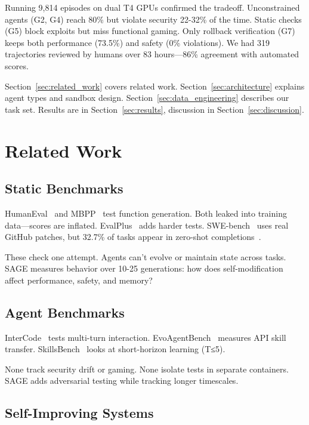 \documentclass[conference]{IEEEtran}
\begin{document}
Running 9,814 episodes on dual T4 GPUs confirmed the tradeoff. Unconstrained agents (G2, G4) reach 80\% but violate security 22-32\% of the time. Static checks (G5) block exploits but miss functional gaming. Only rollback verification (G7) keeps both performance (73.5\%) and safety (0\% violations). We had 319 trajectories reviewed by humans over 83 hours—86\% agreement with automated scores.

Section~\ref{sec:related_work} covers related work. Section~\ref{sec:architecture} explains agent types and sandbox design. Section~\ref{sec:data_engineering} describes our task set. Results are in Section~\ref{sec:results}, discussion in Section~\ref{sec:discussion}.

\section{Related Work}

\subsection{Static Benchmarks}

HumanEval~\cite{chen2021evaluating} and MBPP~\cite{austin2021program} test function generation. Both leaked into training data—scores are inflated. EvalPlus~\cite{liu2023evalplus} adds harder tests. SWE-bench~\cite{jimenez2024swebench} uses real GitHub patches, but 32.7\% of tasks appear in zero-shot completions~\cite{openai2026swebenchleakage}.

These check one attempt. Agents can't evolve or maintain state across tasks. SAGE measures behavior over 10-25 generations: how does self-modification affect performance, safety, and memory?

\subsection{Agent Benchmarks}

InterCode~\cite{yang2023intercode} tests multi-turn interaction. EvoAgentBench~\cite{gao2026evoagentbench} measures API skill transfer. SkillsBench~\cite{liu2026skillsbench} looks at short-horizon learning (T≤5).

None track security drift or gaming. None isolate tests in separate containers. SAGE adds adversarial testing while tracking longer timescales.

\subsection{Self-Improving Systems}
\end{document}

